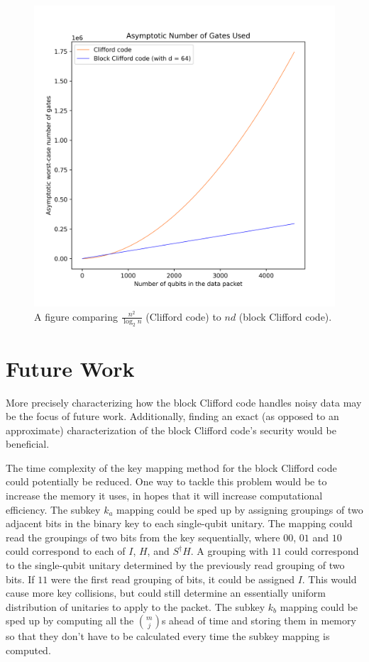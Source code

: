 \begin{figure}
    \centering
    \includegraphics[scale=0.6]{Figures/number_of_gates.png}
    \caption{A figure comparing $\frac{n^2}{\log_2 n}$ (Clifford code) to $nd$ (block Clifford code).}
    \label{fig:numberOfGatesComparison}
\end{figure}

\section{Future Work}
More precisely characterizing how the block Clifford code handles noisy data may be the focus of future work. Additionally, finding an exact (as opposed to an approximate) characterization of the block Clifford code's security would be beneficial. 

The time complexity of the key mapping method for the block Clifford code could potentially be reduced. One way to tackle this problem would be to increase the memory it uses, in hopes that it will increase computational efficiency. The subkey $k_a$ mapping could be sped up by assigning groupings of two adjacent bits in the binary key to each single-qubit unitary. The mapping could read the groupings of two bits from the key sequentially, where $00$, $01$ and $10$ could correspond to each of $I$, $H$, and $S^{\dagger}H$. A grouping with $11$ could correspond to the single-qubit unitary determined by the previously read grouping of two bits. If $11$ were the first read grouping of bits, it could be assigned $I$. This would cause more key collisions, but could still determine an essentially uniform distribution of unitaries to apply to the packet. The subkey $k_b$ mapping could be sped up by computing all the ${m \choose j}$s ahead of time and storing them in memory so that they don't have to be calculated every time the subkey mapping is computed. 

